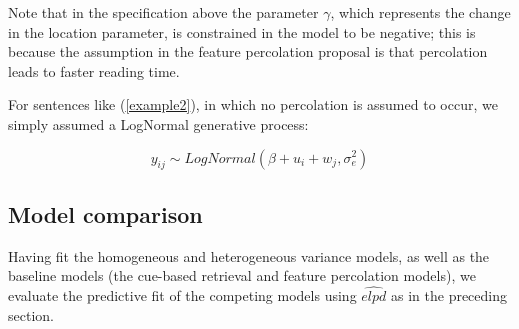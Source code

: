 \documentclass{cambridge7A}\usepackage[]{graphicx}\usepackage[]{color}
\begin{document}
\noindent
Note that in the specification above the parameter $\gamma$, which represents the change in the location parameter, is constrained in the model to be negative; this is because the assumption in the feature percolation proposal is that percolation leads to faster reading time.

For sentences like (\ref{example2}), in which no percolation is assumed to occur, we simply assumed a LogNormal generative process:

\begin{equation}
y_{ij} \sim LogNormal(\beta+u_i+w_j,\sigma_{e}^2)
\end{equation}

\subsection{Model comparison}
Having fit the homogeneous and heterogeneous variance models, as well as the baseline models (the cue-based retrieval and feature percolation models), we evaluate the predictive fit of the competing models using $\widehat{elpd}$ as in the preceding section.
\end{document}
